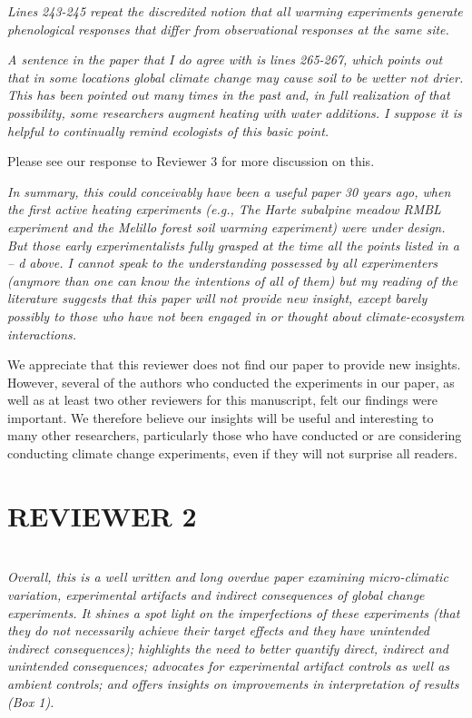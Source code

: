 \documentclass[11pt,a4paper]{letter}
\begin{document}
\begin{letter}{}
\emph {Lines 243-245 repeat the discredited notion that all warming experiments generate phenological responses that differ from observational responses at the same site. } 

\emph{A sentence in the paper that I do agree with is lines 265-267, which points out that in some locations global climate change may cause soil to be wetter not drier.  This has been pointed out many times in the past and, in full realization of that possibility, some researchers augment heating with water additions.  I suppose it is helpful to continually remind ecologists of this basic point.}
\par Please see our response to Reviewer 3 for more discussion on this.

\emph{In summary, this could conceivably have been a useful paper 30 years ago, when the first active heating experiments (e.g., The Harte subalpine meadow RMBL experiment and the Melillo forest soil warming experiment) were under design.  But those early experimentalists fully grasped at the time all the points listed in a -- d above.  I cannot speak to the understanding possessed by all experimenters (anymore than one can know the intentions of all of them) but my reading of the literature suggests that this paper will not provide new insight, except barely possibly to those who have not been engaged in or thought about climate-ecosystem interactions.} 
\par We appreciate that this reviewer does not find our paper to provide new insights. However, several of the authors who conducted the experiments in our paper, as well as at least two other reviewers for this manuscript, felt our findings were important. We therefore believe our insights will be useful and interesting to many other researchers, particularly  those who have conducted or are considering conducting climate change experiments, even if they will not surprise all readers.

\section {REVIEWER 2}\\
\emph{Overall, this is a well written and long overdue paper examining micro-climatic variation, experimental artifacts and indirect consequences of global change experiments.  It shines a spot light on the imperfections of these experiments (that they do not necessarily achieve their target effects and they have unintended indirect consequences); highlights the need to better quantify direct, indirect and unintended consequences; advocates for experimental artifact controls as well as ambient controls;  and offers insights on improvements in interpretation of results (Box 1).}


\end{letter}
\end{document}
